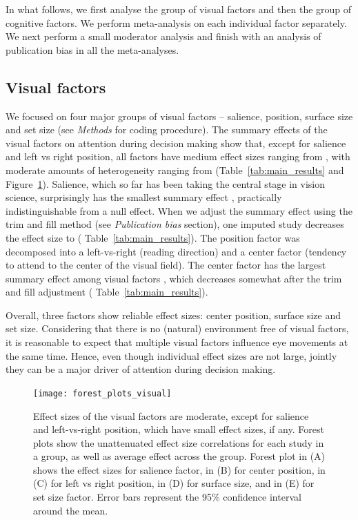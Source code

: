In what follows, we first analyse the group of visual factors and then the group of cognitive factors. We perform meta-analysis on each individual factor  separately. We next perform a small moderator analysis and finish with an analysis of publication bias in all the meta-analyses.  


\subsection{Visual factors}

We focused on four major groups of visual factors -- salience, position, surface size and set size (see \textit{Methods} for coding procedure). The summary effects of the visual factors on attention during decision making show that, except for salience and left vs right position, all factors have medium effect sizes ranging from , with moderate amounts of heterogeneity ranging from  (Table~\ref{tab:main_results} and Figure~\ref{fig:forest_plots_visual}). 
Salience, which so far has been taking the central stage in vision science, surprisingly has the smallest summary effect , practically indistinguishable from a null effect. When we adjust the summary effect using the trim and fill method (see \textit{Publication bias} section), one imputed study decreases the effect size to ( Table~\ref{tab:main_results}). 
The position factor was decomposed into a left-vs-right (reading direction) and a center factor (tendency to attend to the center of the visual field). The center factor has the largest summary effect among visual factors , which decreases somewhat after the trim and fill adjustment ( Table~\ref{tab:main_results}). 

Overall, three factors show reliable effect sizes: center position, surface size and set size. Considering that there is no (natural) environment free of visual factors, it is reasonable to expect that multiple visual factors influence eye movements at the same time. Hence, even though individual effect sizes are not large, jointly they can be a major driver of attention during decision making.




\begin{figure}[!h]
\texttt{[image: forest\_plots\_visual]}
\centering
\caption{Effect sizes of the visual factors are moderate, except for salience and left-vs-right position, which have small effect sizes, if any. Forest plots show the unattenuated effect size correlations for each study in a group, as well as average effect across the group. Forest plot in (A) shows the effect sizes for salience factor, in (B) for center position, in (C) for left vs right position, in  (D) for surface size, and in (E) for set size factor. Error bars represent the 95\% confidence interval around the mean.}
\label{fig:forest_plots_visual}
\end{figure}

